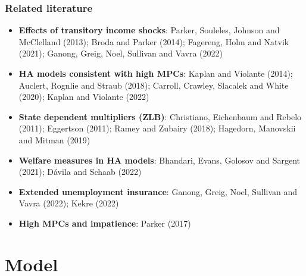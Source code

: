 \documentclass[pdflatex]{beamer}
\begin{document}
\begin{frame}
\frametitle{Related literature}
\small
\begin{itemize}
\item \textbf{Effects of transitory income shocks}: 
Parker, Souleles, Johnson and McClelland (2013); Broda and Parker (2014); Fagereng, Holm and Natvik (2021); Ganong, Greig, Noel, Sullivan and Vavra (2022)
\item \textbf{HA models consistent with high MPCs}: 
Kaplan and Violante (2014); Auclert, Rognlie and Straub (2018); Carroll, Crawley, Slacalek and White (2020); Kaplan and Violante (2022) 
\item \textbf{State dependent multipliers (ZLB)}: 
Christiano, Eichenbaum and Rebelo (2011); Eggertson (2011); Ramey and Zubairy (2018); Hagedorn, Manovskii and Mitman (2019) 
\item \textbf{Welfare measures in HA models}:
Bhandari, Evans, Golosov and Sargent (2021); D{\'a}vila and Schaab (2022)
\item \textbf{Extended unemployment insurance}:
Ganong, Greig, Noel, Sullivan and Vavra (2022); Kekre (2022) 
\item \textbf{High MPCs and impatience}: Parker (2017)
\end{itemize}
\normalsize
\end{frame}





\section{Model}
\end{document}
